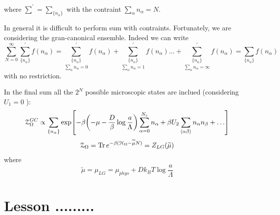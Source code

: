 \documentclass[../main/main.tex]{subfiles}
\begin{document}
where \( \sum_{}^{'} = \sum_{\{ n_ \alpha  \} }^{}     \)  with the contraint \( \sum_{\alpha }^{} n_ \alpha = N   \).
\begin{remark}
In general it is difficult to perform sum with contraints. Fortunately, we are considering the gran-canonical ensemble.
Indeed we can write
\begin{equation}
  \sum_{N=0}^{\infty} \sum_{\{ n_ \alpha  \}}^{'} f(n_ \alpha ) =   \underset{\sum_{\alpha }^{} n_ \alpha =0 }{\sum_{\{ n_ \alpha  \} }^{'}} f (n_ \alpha )  +
  \underset{\sum_{\alpha }^{} n_ \alpha =1 }{\sum_{\{ n_ \alpha  \} }^{'}} f (n_ \alpha )
  \dots +
    \underset{\sum_{\alpha }^{} n_ \alpha = \infty }{\sum_{\{ n_ \alpha  \} }^{'}} f (n_ \alpha ) =  \sum_{\{ n_ \alpha  \}} f(n_ \alpha )
\end{equation}
with no restriction.
\end{remark}
\begin{remark}
In the final sum all the \( 2^N \) possible microscopic states are inclued (considering \( U_1 =0 \) ):
\begin{equation}
  \mathcal{Z}_ \Omega ^{GC} \propto  \sum_{\{ n_ \alpha  \}} \exp [-\beta \qty(-\mu - \frac{D}{\beta } \log{\frac{a}{\Lambda }} ) \sum_{\alpha =0}^{N_c} n_ \alpha  + \beta U_2 \sum_{\expval{\alpha \beta } }^{} n_ \alpha n_ \beta + \dots     ]
\end{equation}
\begin{equation}
  \mathcal{Z}_ \Omega = \Tr e^{-\beta ( \mathcal{H}_ \Omega - \widetilde{\mu} N )} = Z_{LG} ( \widetilde{\mu } )
\end{equation}
where
\begin{equation}
  \widetilde{\mu } = \mu _{LG} = \mu _{phys} + D k_B T \log{\frac{a}{\Lambda }}
\end{equation}
\end{remark}
\clearpage


\section{Lesson .........}
\end{document}
